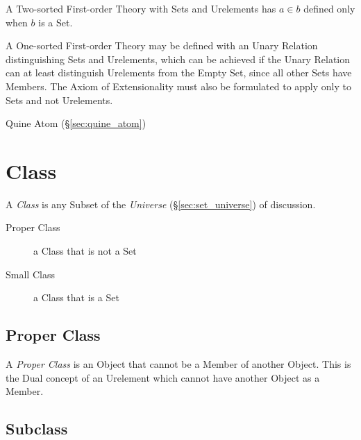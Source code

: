 A Two-sorted First-order Theory with Sets and Urelements has $a \in b$
defined only when $b$ is a Set.

A One-sorted First-order Theory may be defined with an Unary Relation
distinguishing Sets and Urelements, which can be achieved if the Unary
Relation can at least distinguish Urelements from the Empty Set, since
all other Sets have Members. The Axiom of Extensionality must also be
formulated to apply only to Sets and not Urelements.

Quine Atom (\S\ref{sec:quine_atom})



\section{Class}\label{sec:class}

A \emph{Class} is any Subset of the \emph{Universe}
(\S\ref{sec:set_universe}) of discussion.

\begin{description}
  \item [Proper Class] a Class that is not a Set
  \item [Small Class] a Class that is a Set
\end{description}



\subsection{Proper Class}\label{sec:proper_class}

A \emph{Proper Class} is an Object that cannot be a Member of another
Object. This is the Dual concept of an Urelement which cannot have
another Object as a Member.



\subsection{Subclass}\label{sec:subclass}

